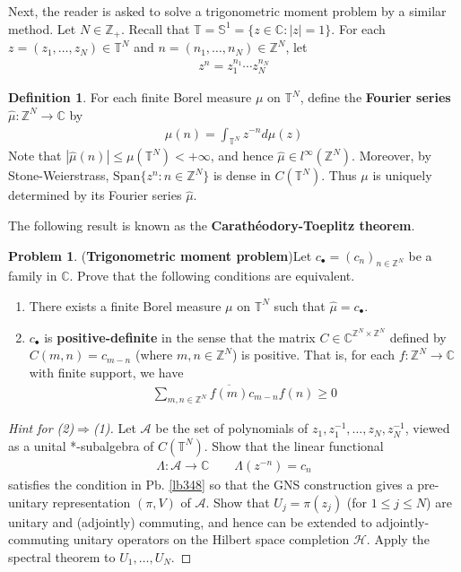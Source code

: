 \documentclass[12pt,b5paper,notitlepage]{article}
\theoremstyle{definition}
\newtheorem{df}{Definition}[subsection]
\newtheorem{prob}{\color{red}Problem}[section]
\theoremstyle{plain}
\newcommand{\wht}{\widehat}
\newcommand{\ovl}{\overline}
\newcommand{\Span}{\mathrm{Span}}
\newcommand{\blt}{\bullet}
\newcommand{\Cbb}{\mathbb C}
\newcommand{\Zbb}{\mathbb Z}
\newcommand{\Tbb}{\mathbb T}
\newcommand{\Sbb}{{\mathbb S}}
\newcommand{\MH}{\mathcal H}
\newcommand{\SA}{\mathscr A}
\numberwithin{equation}{section}
\begin{document}
Next, the reader is asked to solve a trigonometric moment problem by a similar method. Let $N\in\Zbb_+$. Recall that $\Tbb=\Sbb^1=\{z\in\Cbb:|z|=1\}$. For each $z=(z_1,\dots,z_N)\in\Tbb^N$ and $n=(n_1,\dots,n_N)\in\Zbb^N$, let
\begin{align}
z^n=z_1^{n_1}\cdots z_N^{n_N}
\end{align}

\begin{df}
For each finite Borel measure $\mu$ on $\Tbb^N$, define the \textbf{Fourier series} $\wht\mu:\Zbb^N\rightarrow\Cbb$ by  \index{zz@$\wht\mu$, the Fouerier series of $\mu$}
\begin{align*}
\wht\mu(n)=\int_{\Tbb^N}z^{-n}d\mu(z)
\end{align*} 
Note that $|\wht\mu(n)|\leq \mu(\Tbb^N)<+\infty$, and hence $\wht\mu\in l^\infty(\Zbb^N)$. Moreover, by Stone-Weierstrass, $\Span\{z^n:n\in\Zbb^N\}$ is dense in $C(\Tbb^N)$. Thus $\mu$ is uniquely determined by its Fourier series $\wht\mu$.
\end{df}

The following result is known as the \textbf{Carath\'eodory-Toeplitz theorem}. 

\begin{prob}(\textbf{Trigonometric moment problem})\label{lb562}  
Let $c_\blt=(c_n)_{n\in\Zbb^N}$ be a family in $\Cbb$. Prove that the following conditions are equivalent.
\begin{enumerate}
\item[(1)] There exists a finite Borel measure $\mu$ on $\Tbb^N$ such that $\wht\mu=c_\blt$.
\item[(2)] $c_\blt$ is \textbf{positive-definite} in the sense that the matrix $C\in\Cbb^{\Zbb^N\times\Zbb^N}$ defined by $C(m,n)=c_{m-n}$ (where $m,n\in\Zbb^N$) is positive. That is, for each $f:\Zbb^N\rightarrow\Cbb$ with finite support, we have
\begin{align*}
\sum_{m,n\in\Zbb^N}\ovl{f(m)}c_{m-n}f(n)\geq0
\end{align*}
\end{enumerate}
\end{prob}


\begin{proof}[Hint for (2)$\Rightarrow$(1)]
Let $\SA$ be the set of polynomials of $z_1,z_1^{-1},\dots,z_N,z_N^{-1}$, viewed as a unital *-subalgebra of $C(\Tbb^N)$. Show that the linear functional
\begin{align*}
\Lambda:\SA\rightarrow\Cbb\qquad \Lambda(z^{-n})=c_n
\end{align*}
satisfies the condition in Pb. \ref{lb348} so that the GNS construction gives a pre-unitary representation $(\pi,V)$ of $\SA$. Show that $U_j=\pi(z_j)$ (for $1\leq j\leq N$) are unitary and (adjointly) commuting, and hence can be extended to adjointly-commuting unitary operators on the Hilbert space completion $\MH$. Apply the spectral theorem to $U_1,\dots,U_N$. 
\end{proof}
\end{document}
